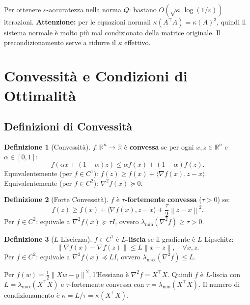 \documentclass[11pt,a4paper]{article}
\theoremstyle{definition}
\newtheorem{definition}{Definizione}[section]
\theoremstyle{plain}
\theoremstyle{remark}
\newcommand{\R}{\mathbb{R}}
\newcommand{\norm}[1]{\left\| #1 \right\|}
\newcommand{\T}{^{\top}}
\newcommand{\grad}{\nabla}
\begin{document}
\begin{intubox}
  Per ottenere $\varepsilon$-accuratezza nella norma $Q$: bastano $O(\sqrt{\kappa}\, \log(1/\varepsilon))$ iterazioni.
  \textbf{Attenzione:} per le equazioni normali $\kappa(A\T A) = \kappa(A)^2$, quindi il sistema normale
  è molto più mal condizionato della matrice originale.
  Il precondizionamento serve a ridurre il $\kappa$ effettivo.
\end{intubox}

\section{Convessità e Condizioni di Ottimalità}
\label{sec:opt}

\subsection{Definizioni di Convessità}

\begin{definition}[Convessità]
  $f : \R^n \to \R$ è \textbf{convessa} se per ogni $x, z \in \R^n$ e $\alpha \in [0,1]$:
  \[
    f(\alpha x + (1-\alpha)z) \leq \alpha f(x) + (1-\alpha)f(z).
  \]
  Equivalentemente (per $f \in C^1$): $f(z) \geq f(x) + \langle\grad f(x), z-x\rangle$.
  Equivalentemente (per $f \in C^2$): $\grad^2 f(x) \succeq 0$.
\end{definition}

\begin{definition}[Forte Convessità]
  $f$ è \textbf{$\tau$-fortemente convessa} ($\tau > 0$) se:
  \[
    f(z) \geq f(x) + \langle\grad f(x), z-x\rangle + \frac{\tau}{2}\norm{z-x}^2.
  \]
  Per $f \in C^2$: equivale a $\grad^2 f(x) \succeq \tau I$, ovvero $\lambda_{\min}(\grad^2 f) \geq \tau > 0$.
\end{definition}

\begin{definition}[$L$-Lisciezza]
  $f \in C^1$ è \textbf{$L$-liscia} se il gradiente è $L$-Lipschitz:
  \[
    \norm{\grad f(x) - \grad f(z)} \leq L\norm{x-z}, \quad \forall x, z.
  \]
  Per $f \in C^2$: equivale a $\grad^2 f(x) \preceq LI$, ovvero $\lambda_{\max}(\grad^2 f) \leq L$.
\end{definition}

\begin{keybox}
  Per $f(w) = \frac{1}{2}\norm{Xw-y}^2$, l'Hessiano è $\grad^2 f = X\T X$.
  Quindi $f$ è $L$-liscia con $L = \lambda_{\max}(X\T X)$ e $\tau$-fortemente convessa con
  $\tau = \lambda_{\min}(X\T X)$. Il numero di condizionamento è $\kappa = L/\tau = \kappa(X\T X)$.
\end{keybox}
\end{document}

